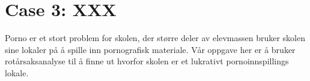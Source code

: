 \section{Case 3: XXX}
\label{sec:XXX}
Porno er et stort problem for skolen, der større deler av elevmassen bruker skolen sine lokaler på å spille inn pornografisk materiale. Vår oppgave her er å bruker rotårsaksanalyse til å finne ut hvorfor skolen er et lukrativt pornoinnspillings lokale.